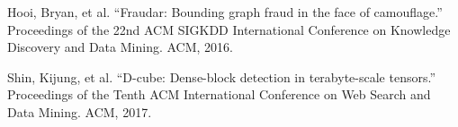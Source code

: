 \documentclass[12pt]{article}
\begin{document}
  
\begin{thebibliography}{99}
 

 Hooi, Bryan, et al. ``Fraudar: Bounding graph fraud in the face of camouflage.'' Proceedings of the 22nd ACM SIGKDD International Conference on Knowledge Discovery and Data Mining. ACM, 2016.

 Shin, Kijung, et al. ``D-cube: Dense-block detection in terabyte-scale tensors.'' Proceedings of the Tenth ACM International Conference on Web Search and Data Mining. ACM, 2017.

\end{thebibliography}
\end{document}
